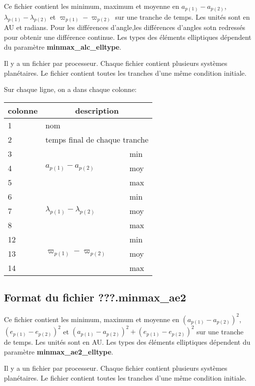 \documentclass[11pt]{article}
\begin{document}
Ce fichier contient les minimum, maximum et moyenne en $a_{p(1)}-a_{p(2)}$, $\lambda_{p(1)}-\lambda_{p(2)}$ et $\varpi_{p(1)}-\varpi_{p(2)}$ sur une tranche de temps. Les unit\'es sont en AU et radians. Pour les diff\'erences d'angle,les différences d'angles sotn redressés pour obtenir une différence continue.
Les types des \'el\'ements elliptiques d\'ependent du param\`etre  {\bf minmax\_alc\_elltype}.

 Il y a un fichier par processeur. Chaque fichier contient plusieurs syst\`emes plan\'etaires. Le fichier contient toutes les tranches d'une m\^eme  condition initiale.


Sur chaque ligne, on a dans chaque colonne: 

\begin{tabularx}{\textwidth}{|l|l|X|}
 \hline
 colonne &      \multicolumn{2}{c|}{description} \\ \hline
1  &    \multicolumn{2}{l|}{nom} \\ \hline
2  &    \multicolumn{2}{l|}{temps final de chaque tranche} \\ \hline
3 &    & min\\
4 &  $a_{p(1)}-a_{p(2)}$ & moy\\
5 & &   max\\ \hline
6 & &   min\\
7 & $\lambda_{p(1)}-\lambda_{p(2)}$ &moy\\
8 &    & max\\ \hline
12 & &    min\\
13 &   $\varpi_{p(1)}-\varpi_{p(2)}$& moy\\
14 & &    max\\ \hline
\end{tabularx}

\subsection{Format du fichier {\bf ???.minmax\_ae2} }

Ce fichier contient les minimum, maximum et moyenne en $(a_{p(1)}-a_{p(2)})^2$, $(e_{p(1)}-e_{p(2)})^2$ et $(a_{p(1)}-a_{p(2)})^2+(e_{p(1)}-e_{p(2)})^2$ sur une tranche de temps. Les unit\'es sont en AU.
Les types des \'el\'ements elliptiques d\'ependent du param\`etre  {\bf minmax\_ae2\_elltype}.

 Il y a un fichier par processeur. Chaque fichier contient plusieurs syst\`emes plan\'etaires. Le fichier contient toutes les tranches d'une m\^eme  condition initiale.
\end{document}
